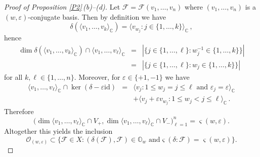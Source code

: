 \documentclass{amsart}
\theoremstyle{definition}
\begin{document}
\begin{proof}[Proof of Proposition \ref{P2}\,{\rm (b)}--{\rm (d)}]
Let $\mathcal{F}=\mathcal{F}(v_1,\ldots,v_n)$ where
$(v_1,\ldots,v_n)$ is a $(w,\varepsilon)$-conjugate basis. Then by
definition we have
\[\delta(\langle v_1,\ldots,v_k\rangle_\mathbb{C})=\langle v_{w_j}:j\in\{1,\ldots,k\}\rangle_\mathbb{C}\,,\]
hence \begin{eqnarray*} \dim \delta(\langle
v_1,\ldots,v_k\rangle_\mathbb{C})\cap \langle v_1,\ldots,v_\ell\rangle_\mathbb{C} & = &
|\{j\in\{1,\ldots,\ell\}:w^{-1}_j\in\{1,\ldots,k\}\}| \\
  & = &
|\{j\in\{1,\ldots,\ell\}:w_j\in\{1,\ldots,k\}\}|
\end{eqnarray*}
for all $k,\ell\in\{1,\ldots,n\}$. Moreover, for
$\varepsilon\in\{+1,-1\}$ we have
\begin{eqnarray*}
\langle
v_1,\ldots,v_\ell\rangle_\mathbb{C}\cap\ker(\delta-\varepsilon\mathrm{id}) & =
&
\langle v_j:1\leq w_j=j\leq \ell\mbox{ and }\varepsilon_j=\varepsilon\rangle_\mathbb{C} \\
 & & +\langle
v_j+\varepsilon v_{w_j}:1\leq w_j<j\leq \ell\rangle_\mathbb{C}\,.
\end{eqnarray*}
Therefore
\[
\big(\dim \langle
v_1,\ldots,v_\ell\rangle_\mathbb{C}\cap V_+,\dim \langle
v_1,\ldots,v_\ell\rangle_\mathbb{C}\cap V_-\big)_{\ell=1}^n=\varsigma(w,\varepsilon).
\]
Altogether this yields the inclusion
\begin{equation}
\label{3} \mathcal{O}_{(w,\varepsilon)}\subset\big\{\mathcal{F}\in
X: (\delta(\mathcal{F}),\mathcal{F})\in\mathbb{O}_{w}\mbox{ and
}\varsigma(\delta:\mathcal{F})=\varsigma(w,\varepsilon)\big\}.
\end{equation}


\end{proof}
\end{document}
